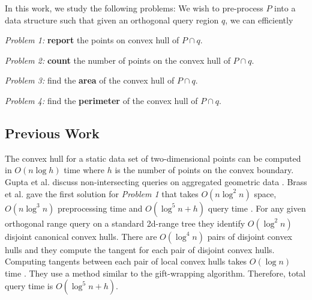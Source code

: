 \documentclass[runningheads,a4paper]{llncs}
\begin{document}
In this work, we study the following problems:
 We wish to pre-process $P$
into a data structure such that given an orthogonal query region $q$, we can efficiently

{\em Problem 1:} {\bf report} the points on convex hull of $P \cap q$.

{\em Problem 2:} {\bf count} the number of points on the convex hull of $P \cap q$.

{\em Problem 3:} find the {\bf area} of the convex hull of $P \cap q$.

{\em Problem 4:} find the {\bf perimeter} of the convex hull of $P \cap q$.
\subsection{Previous Work} \label{prev-work} The convex hull for a static data
set of two-dimensional points can be computed in $O(n \log h)$ time
\cite{opchan} where $h$ is the number of points on the convex boundary.
Gupta et al. discuss non-intersecting queries on aggregated geometric data \cite{gupta}.
Brass et al. gave the first solution for {\em Problem 1} that takes $O(n \log^{2} n)
$ space, $O(n \log^{3} n) $ preprocessing time and $O(\log^{5} n + h ) $ query
time \cite{brass}.  For any given orthogonal range query on a standard
2d-range tree they identify $O( \log^{2} n)$ disjoint canonical convex
hulls. There are $O( \log^{4} n)$ pairs of disjoint convex hulls and they
compute the tangent for each pair of disjoint convex hulls.  Computing
tangents between each pair of local convex hulls takes $O( \log n)$ time \cite{kirkpatrick}. They
use a method similar to the gift-wrapping algorithm.  Therefore, total query
time is $O( \log^{5} n + h)$.
\end{document}
